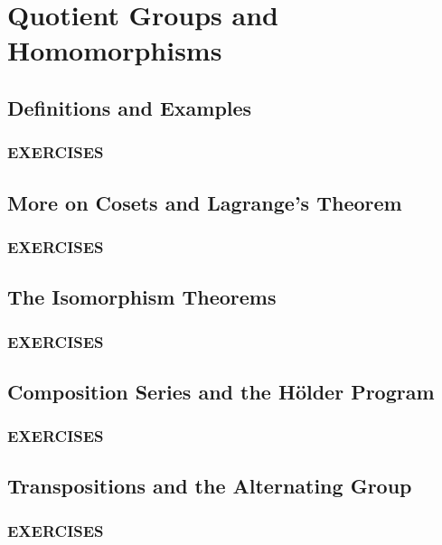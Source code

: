 \chapter{Quotient Groups and Homomorphisms}

\section{Definitions and Examples}
\subsection*{\centering EXERCISES}

\section{More on Cosets and Lagrange's Theorem}
\subsection*{\centering EXERCISES}

\section{The Isomorphism Theorems}
\subsection*{\centering EXERCISES}

\section{Composition Series and the Hölder Program}
\subsection*{\centering EXERCISES}

\section{Transpositions and the Alternating Group}
\subsection*{\centering EXERCISES}

